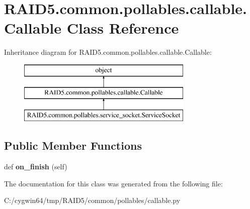 \hypertarget{class_r_a_i_d5_1_1common_1_1pollables_1_1callable_1_1_callable}{}\section{R\+A\+I\+D5.\+common.\+pollables.\+callable.\+Callable Class Reference}
\label{class_r_a_i_d5_1_1common_1_1pollables_1_1callable_1_1_callable}
Inheritance diagram for R\+A\+I\+D5.\+common.\+pollables.\+callable.\+Callable\+:\begin{figure}[H]
\begin{center}
\leavevmode
\includegraphics[height=3.000000cm]{class_r_a_i_d5_1_1common_1_1pollables_1_1callable_1_1_callable}
\end{center}
\end{figure}
\subsection*{Public Member Functions}
\begin{DoxyCompactItemize}
\item 
\mbox{\label{class_r_a_i_d5_1_1common_1_1pollables_1_1callable_1_1_callable_a96d895077ba8cfbfa9afb798634de294}} 
def {\bfseries on\+\_\+finish} (self)
\end{DoxyCompactItemize}


The documentation for this class was generated from the following file\+:\begin{DoxyCompactItemize}
\item 
C\+:/cygwin64/tmp/\+R\+A\+I\+D5/common/pollables/callable.\+py\end{DoxyCompactItemize}
